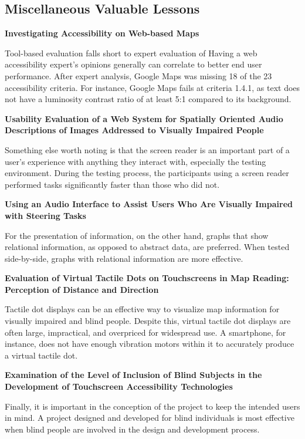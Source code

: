 \documentclass{article}
\begin{document}
\subsection{Miscellaneous Valuable Lessons}
\cite{10.1145/2815169.2815171} \textbf{Investigating Accessibility on Web-based Maps } 

\par Tool-based evaluation falls short to expert evaluation of Having a web accessibility expert’s opinions generally can correlate to better end user performance. After expert analysis, Google Maps was missing 18 of the 23 accessibility criteria. For instance, Google Maps fails at criteria 1.4.1, as text does not have a luminosity contrast ratio of at least 5:1 compared to its background.
\newline

\cite{10.1007/978-3-319-07440-5_15} \textbf{Usability Evaluation of a Web System for Spatially Oriented Audio Descriptions of Images Addressed to Visually Impaired People } 

\par Something else worth noting is that the screen reader is an important part of a user’s experience with anything they interact with, especially the testing environment. During the testing process, the participants using a screen reader performed tasks significantly faster than those who did not.
\newline

\cite{10.1145/1168987.1169008} \textbf{Using an Audio Interface to Assist Users Who Are Visually Impaired with Steering Tasks }
\par For the presentation of information, on the other hand, graphs that show relational information, as opposed to abstract data, are preferred. When tested side-by-side, graphs with relational information are more effective.
\newline

\cite{watanabe2017evaluation}\textbf{Evaluation of Virtual Tactile Dots on Touchscreens in Map Reading: Perception of Distance and Direction }
\par Tactile dot displays can be an effective way to visualize map information for visually impaired and blind people. Despite this, virtual tactile dot displays are often large, impractical, and overpriced for widespread use. A smartphone, for instance, does not have enough vibration motors within it to accurately produce a virtual tactile dot.
\newline

\cite{thompson2018examination}\textbf{Examination of the Level of Inclusion of Blind Subjects in the Development of Touchscreen Accessibility Technologies }

\par Finally, it is important in the conception of the project to keep the intended users in mind. A project designed and developed for blind individuals is most effective when blind people are involved in the design and development process.



\newpage


\end{document}
